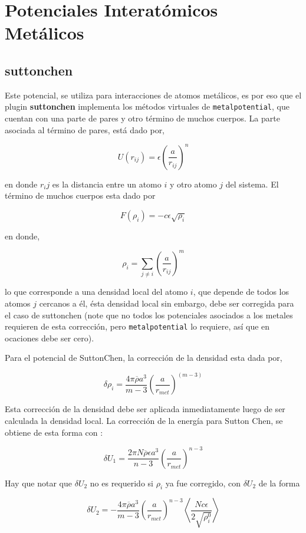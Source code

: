 \section{Potenciales Interat\'omicos Met\'alicos}
\subsection{suttonchen}
Este potencial, se utiliza para interacciones de atomos met\'alicos, es por eso que el plugin \textbf{suttonchen} implementa los m\'etodos virtuales de \verb|metalpotential|, que cuentan con una parte de pares y otro t\'ermino de muchos cuerpos. La parte asociada al t\'ermino de pares, est\'a dado por,

$$U(r_{ij}) = \epsilon\left(\frac{a}{r_{ij}}\right)^n$$

en donde $r_ij$ es la distancia entre un atomo $i$ y otro atomo $j$ del sistema. El t\'ermino de muchos cuerpos esta dado por

$$F(\rho_{i}) = -c\epsilon\sqrt{\rho_i}$$

en donde,

$$\rho_i = \sum_{j\neq i} \left(\frac{a}{r_{ij}}\right)^m$$

lo que corresponde a una densidad local del atomo $i$, que depende de todos los atomos $j$ cercanos a \'el, \'esta densidad local sin embargo, debe ser corregida para el caso de suttonchen (note que no todos los potenciales asociados a los metales requieren de esta correcci\'on, pero \verb|metalpotential| lo requiere, as\'i que en ocaciones debe ser cero).

Para el potencial de SuttonChen, la correcci\'on de la densidad esta dada por,

$$\delta\rho_i=\frac{4\pi\overline{\rho}a^3}{m-3}\left(\frac{a}{r_{met}}\right)^{(m-3)}$$

Esta correcci\'on de la densidad debe ser aplicada inmediatamente luego de ser calculada la densidad local. La correcci\'on de la energ\'ia para Sutton Chen, se obtiene de esta forma con :

$$\delta U_1 = \frac{2\pi N\overline{\rho}\epsilon a^3}{n-3}\left(\frac{a}{r_{met}}\right)^{n-3}$$

Hay que notar que $\delta U_2$ no es requerido si $\rho_i$ ya fue corregido, con $\delta U_2$ de la forma

$$\delta U_2 = -\frac{4\pi\overline{\rho}a^3}{m-3}\left(\frac{a}{r_{met}}\right)^{n-3}\left<\frac{Nc\epsilon}{2\sqrt{\rho_i^0}}\right>$$

